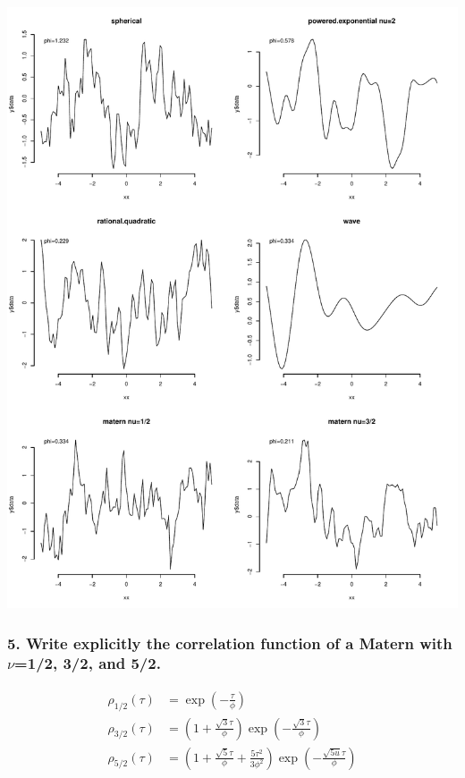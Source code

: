 \documentclass[12pt]{article}
\begin{document}
\begin{center}
\includegraphics[scale=0.67]{figs/simulations.pdf}
\end{center}

\subsubsection*{5. Write explicitly the correlation function of a Matern with $\nu$=1/2, 3/2, and 5/2.}

\begin{align*}
\rho_{1/2}(\tau) &= \exp\left(-\frac{\tau}{\phi}\right) \\
\rho_{3/2}(\tau) &= \left(1+\frac{\sqrt{3}\tau}{\phi}\right)\exp\left(-\frac{\sqrt{3}\tau}{\phi}\right) \\
\rho_{5/2}(\tau) &= \left(1+\frac{\sqrt{5}\tau}{\phi}+\frac{5\tau^2}{3\phi^2}\right)\exp\left(-\frac{\sqrt{5u}\tau}{\phi}\right) \\
\end{align*}
\end{document}
